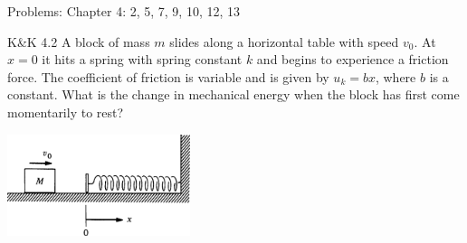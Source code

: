 \documentclass{esg8012pset}
\date{October 15}
\begin{document}
\noindent Problems: Chapter 4: 2, 5, 7, 9, 10, 12, 13


\begin{problem}{K\&K 4.2}
  A block of mass $m$ slides along a horizontal table with speed $v_0$. At $x = 0$ it hits a spring with spring constant $k$ and begins to experience a friction force. The coefficient of friction is variable and is given by $u_k = bx$, where $b$ is a constant. What is the change in mechanical energy when the block has first come momentarily to rest?
  \begin{center}\includegraphics[width=0.4\textwidth]{ps06_1}\end{center}
\end{problem}
\end{document}
